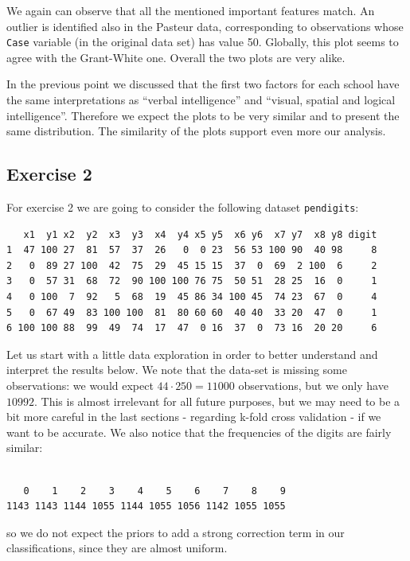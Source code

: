 \documentclass[
  letterpaper,
  DIV=11,
  numbers=noendperiod]{scrartcl}
\begin{document}
We again can observe that all the mentioned important features match. An
outlier is identified also in the Pasteur data, corresponding to
observations whose \texttt{Case} variable (in the original data set) has
value 50. Globally, this plot seems to agree with the Grant-White one.
Overall the two plots are very alike.

In the previous point we discussed that the first two factors for each
school have the same interpretations as ``verbal intelligence'' and
``visual, spatial and logical intelligence''. Therefore we expect the
plots to be very similar and to present the same distribution. The
similarity of the plots support even more our analysis.

\hypertarget{exercise-2}{%
\subsection{Exercise 2}\label{exercise-2}}

For exercise 2 we are going to consider the following dataset
\texttt{pendigits}:

\begin{verbatim}
   x1  y1 x2  y2  x3  y3  x4  y4 x5 y5  x6 y6  x7 y7  x8 y8 digit
1  47 100 27  81  57  37  26   0  0 23  56 53 100 90  40 98     8
2   0  89 27 100  42  75  29  45 15 15  37  0  69  2 100  6     2
3   0  57 31  68  72  90 100 100 76 75  50 51  28 25  16  0     1
4   0 100  7  92   5  68  19  45 86 34 100 45  74 23  67  0     4
5   0  67 49  83 100 100  81  80 60 60  40 40  33 20  47  0     1
6 100 100 88  99  49  74  17  47  0 16  37  0  73 16  20 20     6
\end{verbatim}

Let us start with a little data exploration in order to better
understand and interpret the results below. We note that the data-set is
missing some observations: we would expect \(44\cdot 250=11000\)
observations, but we only have \(10992\). This is almost irrelevant for
all future purposes, but we may need to be a bit more careful in the
last sections - regarding k-fold cross validation - if we want to be
accurate. We also notice that the frequencies of the digits are fairly
similar:

\begin{verbatim}

   0    1    2    3    4    5    6    7    8    9 
1143 1143 1144 1055 1144 1055 1056 1142 1055 1055 
\end{verbatim}

so we do not expect the priors to add a strong correction term in our
classifications, since they are almost uniform.
\end{document}
